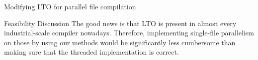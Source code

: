 \begin{section}{Modifying LTO for parallel file compilation}
\begin{subsection}{Feasibility Discussion}
The good news is that LTO is present in almost every industrial-scale compiler
nowadays. Therefore, implementing single-file parallelism on those by using our
methods would be significantly less cumbersome than making sure that the
threaded implementation is correct.


\end{subsection}

\end{section}

%



